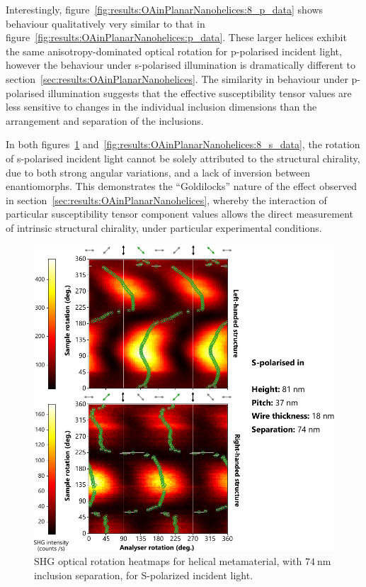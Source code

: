 Interestingly, figure~\ref{fig:results:OAinPlanarNanohelices:8_p_data} shows behaviour qualitatively very similar to that in figure~\ref{fig:results:OAinPlanarNanohelices:p_data}. These larger helices exhibit the same anisotropy-dominated optical rotation for p-polarised incident light, however the behaviour under s-polarised illumination is dramatically different to section~\ref{sec:results:OAinPlanarNanohelices}. The similarity in behaviour under p-polarised illumination suggests that the effective susceptibility tensor values are less sensitive to changes in the individual inclusion dimensions than the arrangement and separation of the inclusions.

In both figures~\ref{fig:results:OAinPlanarNanohelices:b_s_data} and~\ref{fig:results:OAinPlanarNanohelices:8_s_data}, the rotation of s-polarised incident light cannot be solely attributed to the structural chirality, due to both strong angular variations, and a lack of inversion between enantiomorphs. This demonstrates the ``Goldilocks'' nature of the effect observed in section~\ref{sec:results:OAinPlanarNanohelices}, whereby the interaction of particular susceptibility tensor component values allows the direct measurement of intrinsic structural chirality, under particular experimental conditions.

\begin{figure}[htb]	
    \centering	
    \includegraphics[scale=1]{./figures/results/OAinPlanarNanohelices/b_s_data.pdf}
    \caption{\label{fig:results:OAinPlanarNanohelices:b_s_data}
    SHG optical rotation heatmaps for helical metamaterial, with $\SI{74}{\nano\m}$ inclusion separation, for S-polarized incident light.}	
\end{figure}

